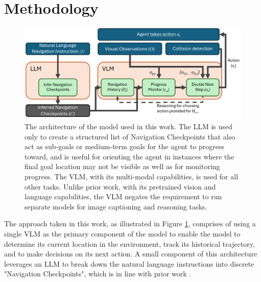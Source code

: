 \documentclass{svproc}
\begin{document}
\section{Methodology}
    \begin{figure}
        \centering
        \includegraphics[scale=.28]{figures/OCOM5300M_VLN_Model.png}
        \caption{The architecture of the model used in this work. The LLM is used only to create a structured list of Navigation Checkpoints that also act as sub-goals or medium-term goals for the agent to progress toward, and is useful for orienting the agent in instances where the final goal location may not be visible as well as for monitoring progress. The VLM, with its multi-modal capabilities, is used for all other tasks. Unlike prior work, with its pretrained vision and language capabilities, the VLM negates the requirement to run separate models for image captioning and reasoning tasks.}
        \label{fig:fig1}
    \end{figure}
    The approach taken in this work, as illustrated in Figure \ref{fig:fig1}, comprises of using a single VLM as the primary component of the model to enable the model to determine its current location in the environment, track its historical trajectory, and to make decisions on its next action. A small component of this architecture leverages an LLM to break down the natural language instructions into discrete "Navigation Checkpoints", which is in line with prior work \cite{ chen-etal-2024-mapgpt, pan2024langnavlanguageperceptualrepresentation, zhou2023navgptexplicitreasoningvisionandlanguage}.
    
\end{document}
